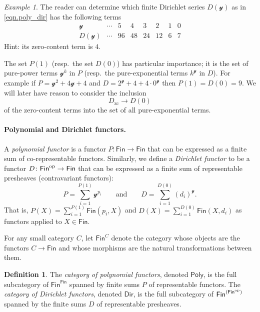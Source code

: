 \documentclass[11pt, article, one side]{memoir}
\theoremstyle{theorem}
\theoremstyle{definition}
\newtheorem{definition}[equation]{Definition}
\theoremstyle{remark}
\newtheorem{example}[equation]{Example}
\newcommand{\Cat}[1]{\mathsf{#1}}%
\newcommand{\op}{^\tn{op}}
\newcommand{\tn}[1]{\textnormal{#1}}
\newcommand{\finset}{\Cat{Fin}}
\newcommand{\zero}[1]{#1_\text{zc}}
\newcommand{\yon}{\mathcal{y}}
\newcommand{\poly}{\Cat{Poly}}
\newcommand{\dir}{\Cat{Dir}}
\newcommand{\mdot}{{\cdot}}
\newcommand{\qqand}{\qquad\text{and}\qquad}
\begin{document}
\begin{example}
The reader can determine which finite Dirichlet series $D(\yon)$ as in \cref{eqn.poly_dir} has the following terms
\[
\begin{array}{c|ccccccc}
\yon&
\cdots&
5&
4&
3&
2&
1&
0
\\\hline
D(\yon)&
\cdots&
96&
48&
24&
12&
6&
7
\end{array}
\]
Hint: its zero-content term is $4$.
\end{example}

The set $P(1)$ (resp.\ the set $D(0)$) has particular importance; it is the set of pure-power terms $\yon^k$ in $P$ (resp.\ the pure-exponential terms $k^\yon$ in $D$). For example if $P=\yon^2+4\yon+4$ and $D=2^\yon+4+4\mdot0^\yon$ then $P(1)=D(0)=9$. We will later have reason to consider the inclusion
\begin{equation}\label{eqn.zerocontent}
\zero{D}\to D(0)
\end{equation}
of the zero-content terms into the set of all pure-exponential terms.

\paragraph{Polynomial and Dirichlet functors.}
A \emph{polynomial functor} \cite{GambinoKock} is a functor $P\colon\finset\to\finset$ that can be expressed as a finite sum of co-representable functors. Similarly, we define a \emph{Dirichlet functor} to be a functor $D\colon\finset\op\to\finset$ that can be expressed as a finite sum of representable presheaves (contravariant functors):
\begin{equation}\label{eqn.finite_sum}
  P=\sum_{i=1}^{P(1)}\yon^{p_i}
  \qqand
  D=\sum_{i=1}^{D(0)}(d_i)^\yon.
\end{equation}
That is, $P(X)=\sum_{i=1}^{P(1)}\finset(p_i,X)$ and $D(X)=\sum_{i=1}^{D(0)}\finset(X,d_i)$ as functors applied to $X\in\finset$.

For any small category $C$, let $\finset^C$ denote the category whose objects are the functors $C\to\finset$ and whose morphisms are the natural transformations between them.

\begin{definition}\label{def.poly_dir}
The \emph{category of polynomial functors}, denoted $\poly$, is the full subcategory of $\finset^\finset$ spanned by finite sums $P$ of representable functors. The \emph{category of Dirichlet functors}, denoted $\dir$, is the full subcategory of $\finset^{(\finset\op)}$ spanned by the finite sums $D$ of representable presheaves.
\end{definition}
\end{document}
